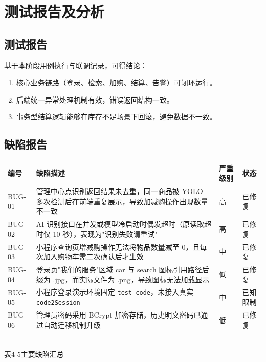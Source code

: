 \section{测试报告及分析}

\subsection{测试报告}
基于本阶段用例执行与联调记录，可得结论：
\begin{enumerate}[leftmargin=2em]
  \item 核心业务链路（登录、检索、加购、结算、告警）可闭环运行。
  \item 后端统一异常处理机制有效，错误返回结构一致。
  \item 事务型结算逻辑能够在库存不足场景下回滚，避免数据不一致。
\end{enumerate}

\subsection{缺陷报告}
\begin{center}
  \renewcommand{\arraystretch}{1.35}
  \begin{tabular}{|>{\centering\arraybackslash}m{1.6cm}|>{\centering\arraybackslash}m{4.8cm}|>{\centering\arraybackslash}m{2.5cm}|>{\centering\arraybackslash}m{3.0cm}|}
    \hline
    \textbf{编号} & \textbf{缺陷描述} & \textbf{严重级别} & \textbf{状态} \\ \hline
    BUG-01 & 管理中心点识别返回结果未去重，同一商品被 YOLO 多次检测后在前端重复展示，导致加减购操作出现数量不一致 & 高 & 已修复 \\ \hline
    BUG-02 & AI 识别接口在并发或模型冷启动时偶发超时（原读取超时仅 10 秒），表现为"识别失败请重试" & 高 & 已修复 \\ \hline
    BUG-03 & 小程序查询页增减购操作无法将物品数量减至 0，且每次加入购物车需二次确认后才生效 & 中 & 已修复 \\ \hline
    BUG-04 & 登录页"我们的服务"区域 car 与 search 图标引用路径后缀为 .jpg，而实际文件为 .png，导致图标无法加载显示 & 低 & 已修复 \\ \hline
    BUG-05 & 小程序登录演示环境固定 \texttt{test\_code}，未接入真实 \texttt{code2Session} & 中 & 已知限制 \\ \hline
    BUG-06 & 管理员密码采用 BCrypt 加密存储，历史明文密码已通过自动迁移机制升级 & 低 & 已修复 \\ \hline
  \end{tabular}
  \\[0.3em]
  {表4-5\quad 主要缺陷汇总}
\end{center}

